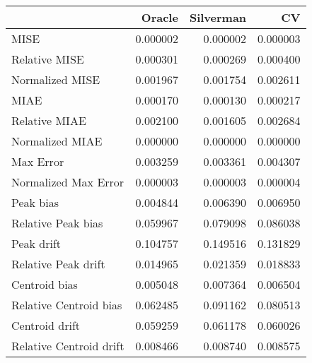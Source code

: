\begin{tabular}{lrrr}
  \hline
 & Oracle & Silverman & CV \\ 
  \hline
MISE & 0.000002 & 0.000002 & 0.000003 \\ 
  Relative MISE & 0.000301 & 0.000269 & 0.000400 \\ 
  Normalized MISE & 0.001967 & 0.001754 & 0.002611 \\ 
  MIAE & 0.000170 & 0.000130 & 0.000217 \\ 
  Relative MIAE & 0.002100 & 0.001605 & 0.002684 \\ 
  Normalized MIAE & 0.000000 & 0.000000 & 0.000000 \\ 
  Max Error & 0.003259 & 0.003361 & 0.004307 \\ 
  Normalized Max Error & 0.000003 & 0.000003 & 0.000004 \\ 
  Peak bias & 0.004844 & 0.006390 & 0.006950 \\ 
  Relative Peak bias & 0.059967 & 0.079098 & 0.086038 \\ 
  Peak drift & 0.104757 & 0.149516 & 0.131829 \\ 
  Relative Peak drift & 0.014965 & 0.021359 & 0.018833 \\ 
  Centroid bias & 0.005048 & 0.007364 & 0.006504 \\ 
  Relative Centroid bias & 0.062485 & 0.091162 & 0.080513 \\ 
  Centroid drift & 0.059259 & 0.061178 & 0.060026 \\ 
  Relative Centroid drift & 0.008466 & 0.008740 & 0.008575 \\ 
   \hline
\end{tabular}
